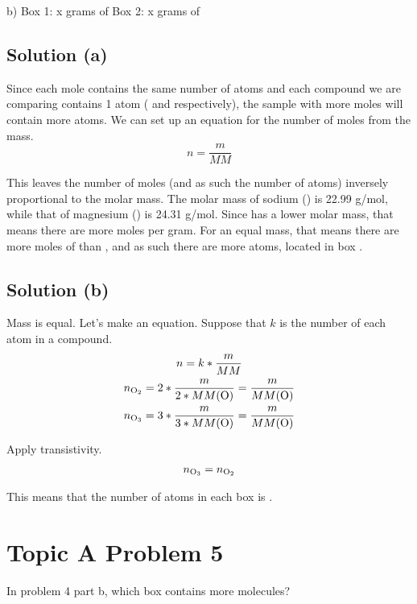 \documentclass[10pt]{article}
\begin{document}
        b) Box 1: x grams of     Box 2: x grams of 

        \subsection{Solution (a)}
            Since each mole contains the same number of atoms and each compound we are comparing contains 1 atom ( and  respectively), the sample with more moles will contain more atoms.
            We can set up an equation for the number of moles from the mass.
            \begin{equation}
                n = \frac{m}{MM}
            \end{equation}

            This leaves the number of moles (and as such the number of atoms) inversely proportional to the molar mass. 
            The molar mass of sodium () is 22.99 \unit{\gram/\mole}, while that of magnesium () is 24.31 \unit{\gram/\mole}.
            Since  has a lower molar mass, that means there are more moles per gram.
            For an equal mass, that means there are more moles of  than , and as such there are more  atoms, located in box . 

        \subsection{Solution (b)}
            Mass is equal.
            Let's make an equation.
            Suppose that $k$ is the number of each atom in a compound.
            \begin{gather}
                n   =   k * \frac{m}{MM}\\
                n_{\ce{O2}} =   2 * \frac{m}{2 * MM(\ce{O})} = \frac{m}{MM(\ce{O})}\\
                n_{\ce{O3}} =   3 * \frac{m}{3 * MM(\ce{O})} = \frac{m}{MM(\ce{O})}
            \end{gather}

            Apply transistivity.
            \begin{gather}
                n_{\ce{O3}}   =   n_{\ce{O2}}
            \end{gather}

            This means that the number of atoms in each box is .


    \pagebreak
    \section{Topic A Problem 5}
        In problem 4 part b, which box contains more molecules?
        
\end{document}

